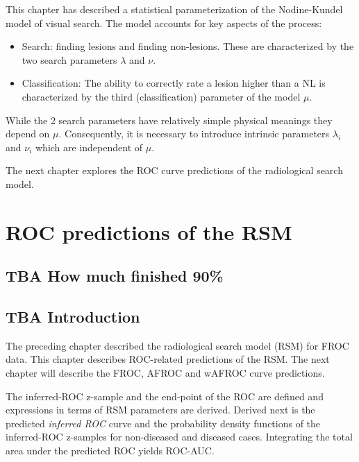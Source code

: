 \documentclass[
]{book}
\providecommand{\tightlist}{%
  \setlength{\itemsep}{0pt}\setlength{\parskip}{0pt}}
\begin{document}
This chapter has described a statistical parameterization of the Nodine-Kundel model of visual search. The model accounts for key aspects of the process:

\begin{itemize}
\tightlist
\item
  Search: finding lesions and finding non-lesions. These are characterized by the two search parameters \(\lambda\) and \(\nu\).
\item
  Classification: The ability to correctly rate a lesion higher than a NL is characterized by the third (classification) parameter of the model \(\mu\).
\end{itemize}

While the 2 search parameters have relatively simple physical meanings they depend on \(\mu\). Consequently, it is necessary to introduce intrinsic parameters \(\lambda_i\) and \(\nu_i\) which are independent of \(\mu\).

The next chapter explores the ROC curve predictions of the radiological search model.

\hypertarget{rsm-predictions}{%
\chapter{ROC predictions of the RSM}\label{rsm-predictions}}

\hypertarget{rsm-predictions-how-much-finished}{%
\section{TBA How much finished 90\%}\label{rsm-predictions-how-much-finished}}

\hypertarget{rsm-predictions-intro}{%
\section{TBA Introduction}\label{rsm-predictions-intro}}

The preceding chapter described the radiological search model (RSM) for FROC data. This chapter describes ROC-related predictions of the RSM. The next chapter will describe the FROC, AFROC and wAFROC curve predictions.

The inferred-ROC z-sample and the end-point of the ROC are defined and expressions in terms of RSM parameters are derived. Derived next is the predicted \emph{inferred ROC} curve and the probability density functions of the inferred-ROC z-samples for non-diseased and diseased cases. Integrating the total area under the predicted ROC yields ROC-AUC.
\end{document}
